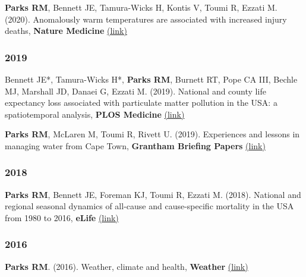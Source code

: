 \noindent \textbf{Parks RM}, Bennett JE, Tamura-Wicks H, Kontis V, Toumi R, Ezzati M. (2020). Anomalously warm temperatures are associated with increased injury deaths, \textbf{Nature Medicine} \href{https://www.nature.com/articles/s41591-019-0721-y}{(link)}

\subsubsection*{2019}

\noindent Bennett JE*, Tamura-Wicks H*, \textbf{Parks RM}, Burnett RT, Pope CA III, Bechle MJ, Marshall JD, Danaei G, Ezzati M. (2019). National and county life expectancy loss associated with particulate matter pollution in the USA: a spatiotemporal analysis, \textbf{PLOS Medicine} \href{https://doi.org/10.1371/journal.pmed.1002856}{(link)}

\vspace{2mm}

\noindent \textbf{Parks RM}, McLaren M, Toumi R, Rivett U. (2019). Experiences and lessons in managing water from Cape Town, \textbf{Grantham Briefing Papers} \href{https://bit.ly/2Uu9oAh}{(link)}

\subsubsection*{2018}
\noindent \textbf{Parks RM}, Bennett JE, Foreman KJ, Toumi R, Ezzati M. (2018). National and regional seasonal dynamics of all-cause and cause-specific mortality in the USA from 1980 to 2016, \textbf{eLife}  \href{https://doi.org/10.7554/eLife.35500}{(link)}


\subsubsection*{2016}
\noindent \textbf{Parks RM}. (2016). Weather, climate and health, \textbf{Weather} \href{https://doi.org/10.1002/wea.2752}{(link)}

